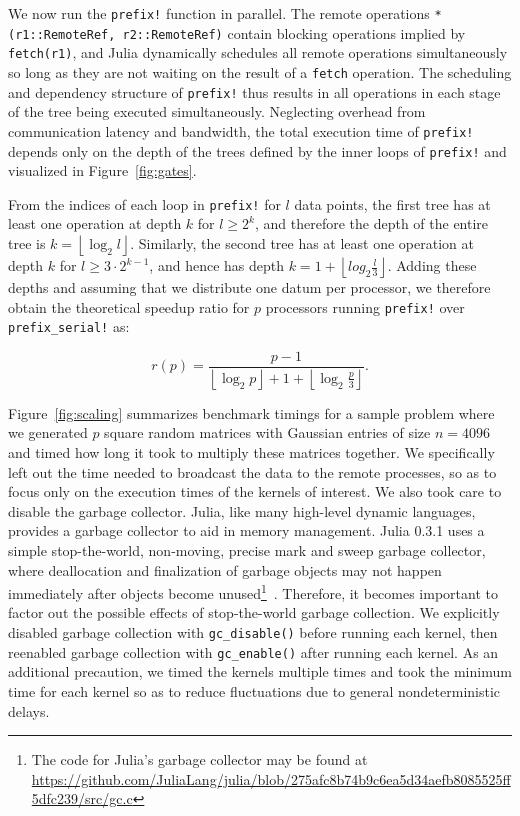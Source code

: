 \documentclass{sig-alternate}
\newcommand{\code}[1]{\texttt{#1}}
\newcommand{\floor}[1]{\left\lfloor #1 \right\rfloor}
\begin{document}
We now run the \code{prefix!} function in parallel. The remote operations
\code{*(r1::RemoteRef, r2::RemoteRef)} contain blocking operations implied by
\code{fetch(r1)}, and Julia dynamically schedules all remote operations
simultaneously so long as they are not waiting on the result of a \code{fetch}
operation. The scheduling and dependency structure of \code{prefix!} thus
results in all operations in each stage of the tree being executed
simultaneously. Neglecting overhead from communication latency and bandwidth,
the total execution time of \code{prefix!} depends only on the depth of the
trees defined by the inner loops of \code{prefix!} and visualized in
Figure~\ref{fig:gates}.

From the indices of each loop in \code{prefix!} for $l$ data points, the first
tree has at least one operation at depth $k$ for $l \ge 2^k$, and therefore the
depth of the entire tree is $k = \floor{\log_2 l}$. Similarly, the second tree
has at least one operation at depth $k$ for $l \ge 3\cdot2^{k-1}$, and hence
has depth $k = 1 + \floor{log_2 \frac l 3}$. Adding these depths and assuming
that we distribute one datum per processor, we therefore obtain the theoretical
speedup ratio for $p$ processors running \code{prefix!} over
\code{prefix\allowbreak\_serial!} as:

\begin{equation}
    r (p) = \frac {p-1} {\floor{\log_2 p} + 1 + \floor{\log_2 \frac p 3}}.
    \label{eq:scaling-theory}
\end{equation}

Figure~\ref{fig:scaling} summarizes benchmark timings for a sample problem
where we generated $p$ square random matrices with Gaussian entries of size $n
= 4096$ and timed how long it took to multiply these matrices together.  We
specifically left out the time needed to broadcast the data to the remote
processes, so as to focus only on the execution times of the kernels of
interest. We also took care to disable the garbage collector. Julia, like many
high-level dynamic languages, provides a garbage collector to aid in memory
management. Julia 0.3.1 uses a simple stop-the-world, non-moving, precise mark
and sweep garbage collector, where deallocation and finalization of garbage
objects may not happen immediately after objects become unused\footnote{The
code for Julia's garbage collector may be found at
\url{https://github.com/JuliaLang/julia/blob/275afc8b74b9c6ea5d34aefb8085525ff5dfc239/src/gc.c}}~\cite{McCarthy1960}.
Therefore, it becomes important to factor out the possible effects of
stop-the-world garbage collection. We explicitly disabled garbage collection
with \code{gc\_disable()} before running each kernel, then reenabled garbage
collection with \code{gc\_enable()} after running each kernel. As an additional
precaution, we timed the kernels multiple times and took the minimum time for
each kernel so as to reduce fluctuations due to general nondeterministic
delays.
\end{document}

